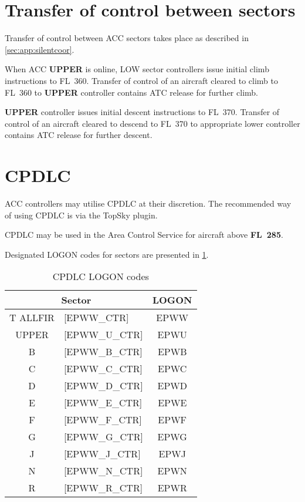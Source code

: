 \section{Transfer of control between sectors}

Transfer of control between ACC sectors takes place as described in
\cref{sec:app:silentcoor}.

When ACC \textbf{\color{OliveGreen}UPPER\color{black}} is online, LOW sector controllers
issue initial climb instructions to FL~360. Transfer of control of an aircraft
cleared to climb to FL~360 to \textbf{\color{OliveGreen}UPPER\color{black}} controller
contains ATC release for further climb.

\textbf{\color{OliveGreen}UPPER\color{black}} controller issues initial descent
instructions to FL~370. Transfer of control of an aircraft cleared to descend to
FL~370 to appropriate lower controller contains ATC release for further descent.

\section{CPDLC}
\label{sec:acc:cpdlc}

ACC controllers may utilise CPDLC at their discretion. The recommended way of
using CPDLC is via the TopSky plugin.

CPDLC may be used in the Area Control Service for aircraft above
\textbf{FL~285}.

Designated LOGON codes for sectors are presented in \cref{tab:acc:cpdlc}.

\begin{table}[htbp]
  \centering
  \begin{tabular}{|c l|c|}
    \hline
    \multicolumn{2}{|c|}{\cellcolor{vred}\color{white}\textbf{Sector}}&\cellcolor{vred}\color{white}\textbf{LOGON}\\\hline
    \color{Orange}T ALLFIR & \tiny [EPWW\_CTR] & EPWW\\\hline
    \color{OliveGreen}UPPER & \tiny [EPWW\_U\_CTR] & EPWU\\\hline
    \color{ProcessBlue}B & \tiny [EPWW\_B\_CTR] & EPWB\\\hline
    \color{Orange}C & \tiny [EPWW\_C\_CTR] & EPWC\\\hline
    \color{Orange}D & \tiny [EPWW\_D\_CTR] & EPWD\\\hline
    \color{MidnightBlue}E & \tiny [EPWW\_E\_CTR] & EPWE\\\hline
    \color{ProcessBlue}F & \tiny [EPWW\_F\_CTR] & EPWF\\\hline
    \color{ProcessBlue}G & \tiny [EPWW\_G\_CTR] & EPWG\\\hline
    \color{vred}J & \tiny [EPWW\_J\_CTR] & EPWJ\\\hline
    \color{MidnightBlue}N & \tiny [EPWW\_N\_CTR] & EPWN\\\hline
    \color{vred}R & \tiny [EPWW\_R\_CTR] & EPWR\\\hline
  \end{tabular}
  \caption{CPDLC LOGON codes}
  \label{tab:acc:cpdlc}
\end{table}

